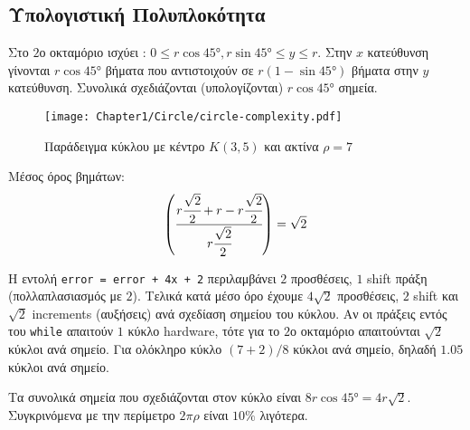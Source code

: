\subsection{Υπολογιστική Πολυπλοκότητα}

Στο $2$ο οκταμόριο ισχύει : $0 \leq r\cos{\ang{45}}, r \sin{\ang{45}} \leq  y \leq  r$. Στην $x$ κατεύθυνση γίνονται $r \cos{\ang{45}}$ βήματα που αντιστοιχούν σε $ r(1 - \sin{\ang{45}})$ βήματα στην $y$ κατεύθυνση. Συνολικά σχεδιάζονται (υπολογίζονται) $r \cos{\ang{45}}$ σημεία.


\begin{figure}[hbt]
  \begin{center}
	\texttt{[image: Chapter1/Circle/circle-complexity.pdf]}
  \end{center}
  \caption{Παράδειγμα κύκλου με κέντρο $K(3,5)$ και ακτίνα $\rho = 7$}
\end{figure}





Μέσος όρος βημάτων:
\[
	\left( \cfrac{r\cfrac{\sqrt{2}}{2} + r - r\cfrac{\sqrt{2}}{2} }{r\cfrac{\sqrt{2}}{2}} \right) = \sqrt{2}
\]


Η εντολή \texttt{error = error + 4x + 2} περιλαμβάνει $2$ προσθέσεις, $1$ shift πράξη (πολλαπλασιασμός με $2$). Τελικά κατά μέσο όρο έχουμε $4\sqrt{2}$ προσθέσεις, $2$ shift και $\sqrt{2}$ increments (αυξήσεις) ανά σχεδίαση σημείου του κύκλου.
Αν οι πράξεις εντός του \texttt{while} απαιτούν $1$ κύκλο hardware, τότε για το $2$ο οκταμόριο απαιτούνται $\sqrt{2}$ κύκλοι ανά σημείο. Για ολόκληρο κύκλο $(7+ 2) /8$ κύκλοι ανά σημείο, δηλαδή $1.05$ κύκλοι ανά σημείο.
\begin{remark}
Τα συνολικά σημεία που σχεδιάζονται στον κύκλο είναι $8r \cos{\ang{45}} = 4r \sqrt{2}$. Συγκρινόμενα με την περίμετρο $2 \pi\rho$ είναι $10\%$ λιγότερα. 
\end{remark}